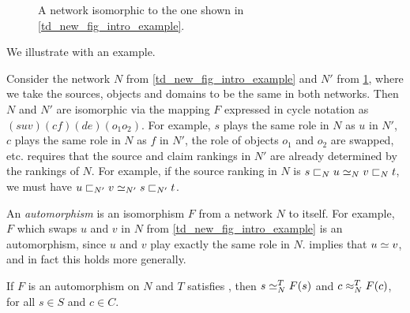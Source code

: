 \begin{figure}
    \centering
    \caption{
        A network isomorphic to the one shown in \cref{td_new_fig_intro_example}.
    }
    \label{td_new_fig_symmetry_example}
\end{figure}

We illustrate \symmetry{} with an example.

\begin{example}
    Consider the network $N$ from \cref{td_new_fig_intro_example} and $N'$ from
    \cref{td_new_fig_symmetry_example}, where we take the sources, objects and
    domains to be the same in both networks. Then $N$ and $N'$ are isomorphic
    via the mapping $F$ expressed in cycle notation as $(suv)(cf)(de)(o_1o_2)$.
    For example, $s$ plays the same role in $N$ as $u$ in $N'$, $c$ plays the
    same role in $N$ as $f$ in $N'$, the role of objects $o_1$ and $o_2$ are
    swapped, etc. \symmetry{} requires that the source and claim rankings in
    $N'$ are already determined by the rankings of $N$.  For example, if the
    source ranking in $N$ is $s \sqsubset_N u \simeq_N v \sqsubset_N t$, we must have $u
    \sqsubset_{N'} v \simeq_{N'} s \sqsubset_{N'} t$.
\end{example}

An \emph{automorphism} is an isomorphism $F$ from a network $N$ to itself. For
example, $F$ which swaps $u$ and $v$ in $N$ from
\cref{td_new_fig_intro_example} is an automorphism, since $u$ and $v$ play
exactly the same role in $N$. \symmetry{} implies that $u \simeq v$, and in fact
this holds more generally.

\begin{proposition}
    \label{td_new_prop_automorphism}
    If $F$ is an automorphism on $N$ and $T$ satisfies \symmetry{}, then $s
    \simeq_N^T F(s)$ and $c \approx_N^T F(c)$, for all $s \in S$ and $c \in C$.
\end{proposition}

